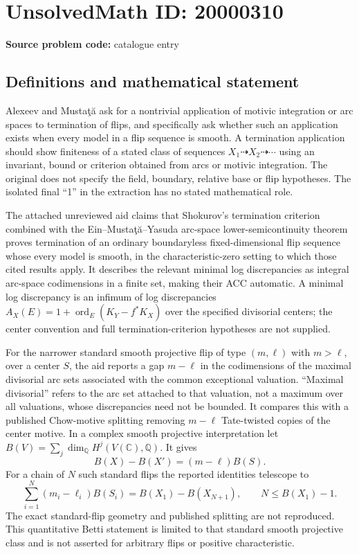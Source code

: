 \documentclass[11pt]{article}
\newcommand{\Q}{\mathbb{Q}}
\newcommand{\C}{\mathbb{C}}
\begin{document}
\section*{UnsolvedMath ID: 20000310}
\textbf{Source problem code:} catalogue entry
\subsection{Definitions and mathematical statement}
Alexeev and Musta\c t\u a ask for a nontrivial application of motivic integration or arc spaces to termination of flips, and specifically ask whether such an application exists when every model in a flip sequence is smooth. A termination application should show finiteness of a stated class of sequences $X_1\dashrightarrow X_2\dashrightarrow\cdots$ using an invariant, bound or criterion obtained from arcs or motivic integration. The original does not specify the field, boundary, relative base or flip hypotheses. The isolated final ``1'' in the extraction has no stated mathematical role.

The attached unreviewed aid claims that Shokurov's termination criterion combined with the Ein--Musta\c t\u a--Yasuda arc-space lower-semicontinuity theorem proves termination of an ordinary boundaryless fixed-dimensional flip sequence whose every model is smooth, in the characteristic-zero setting to which those cited results apply. It describes the relevant minimal log discrepancies as integral arc-space codimensions in a finite set, making their ACC automatic. A minimal log discrepancy is an infimum of log discrepancies $A_X(E)=1+\operatorname{ord}_E(K_Y-f^*K_X)$ over the specified divisorial centers; the center convention and full termination-criterion hypotheses are not supplied.

For the narrower standard smooth projective flip of type $(m,\ell)$ with $m>\ell$, over a center $S$, the aid reports a gap $m-\ell$ in the codimensions of the maximal divisorial arc sets associated with the common exceptional valuation. ``Maximal divisorial'' refers to the arc set attached to that valuation, not a maximum over all valuations, whose discrepancies need not be bounded. It compares this with a published Chow-motive splitting removing $m-\ell$ Tate-twisted copies of the center motive. In a complex smooth projective interpretation let $B(V)=\sum_j\dim_\Q H^j(V(\C),\Q)$. It gives
\[
B(X)-B(X')=(m-\ell)B(S).
\]
For a chain of $N$ such standard flips the reported identities telescope to
\[
\sum_{i=1}^N(m_i-\ell_i)B(S_i)=B(X_1)-B(X_{N+1}),
\qquad N\le B(X_1)-1.
\]
The exact standard-flip geometry and published splitting are not reproduced. This quantitative Betti statement is limited to that standard smooth projective class and is not asserted for arbitrary flips or positive characteristic.
\end{document}
